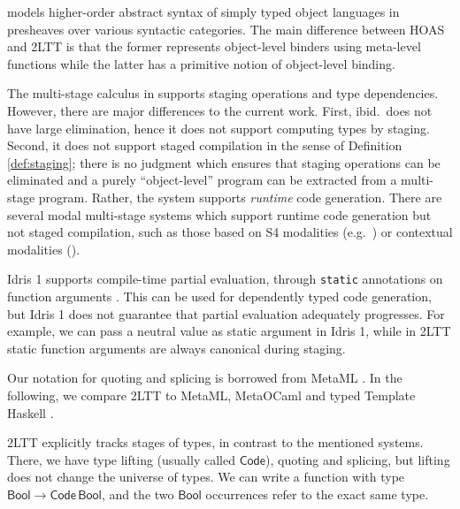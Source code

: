 \documentclass[acmsmall,screen]{acmart}
\newcommand{\msf}[1]{\mathsf{#1}}
\newcommand{\Bool}{\msf{Bool}}
\theoremstyle{remark}
\begin{document}
\cite{DBLP:conf/lics/Hofmann99} models higher-order abstract syntax of simply
typed object languages in presheaves over various syntactic categories. The main
difference between HOAS and 2LTT is that the former represents object-level binders
using meta-level functions while the latter has a primitive notion of object-level
binding.

The multi-stage calculus in \cite{multi-stage-calculus} supports staging
operations and type dependencies. However, there are major differences to the
current work. First, ibid.\ does not have large elimination, hence it does not
support computing types by staging. Second, it does not support staged
compilation in the sense of Definition \ref{def:staging}; there is no judgment
which ensures that staging operations can be eliminated and a purely
``object-level'' program can be extracted from a multi-stage program. Rather, the system
supports \emph{runtime} code generation. There are several modal multi-stage
systems which support runtime code generation but not staged compilation, such
as those based on S4 modalities (e.g.\ \cite{DBLP:journals/jacm/DaviesP01}) or
contextual modalities (\cite{DBLP:journals/pacmpl/JangGMP22}).


Idris 1 supports compile-time partial evaluation, through \texttt{static}
annotations on function arguments \cite{scrap-your-inefficient-engine}. This can
be used for dependently typed code generation, but Idris 1 does not guarantee
that partial evaluation adequately progresses. For example, we can pass a neutral
value as static argument in Idris 1, while in 2LTT static function arguments
are always canonical during staging.

Our notation for quoting and splicing is borrowed from MetaML \cite{metaml}.  In
the following, we compare 2LTT to MetaML, MetaOCaml \cite{kiselyov14metaocaml}
and typed Template Haskell \cite{typed-th}.

2LTT explicitly tracks stages of types, in contrast to the mentioned
systems. There, we have type lifting (usually called $\msf{Code}$), quoting and
splicing, but lifting does not change the universe of types. We can write a
function with type $\Bool \to \msf{Code}\,\Bool$, and the two $\Bool$
occurrences refer to the exact same type.
\end{document}
